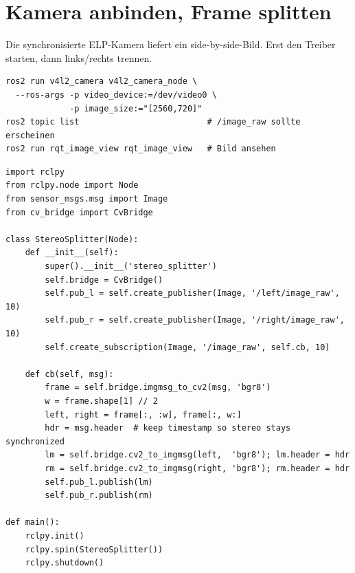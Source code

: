 
\chapter{Kamera anbinden, Frame splitten}

Die synchronisierte ELP-Kamera liefert ein side-by-side-Bild. Erst den Treiber
starten, dann links/rechts trennen.
\begin{lstlisting}[style=bash,caption={Treiber starten und Topics prüfen}]
ros2 run v4l2_camera v4l2_camera_node \
  --ros-args -p video_device:=/dev/video0 \
             -p image_size:="[2560,720]"
ros2 topic list                          # /image_raw sollte erscheinen
ros2 run rqt_image_view rqt_image_view   # Bild ansehen
\end{lstlisting}

\begin{lstlisting}[style=py,caption={Knoten: side-by-side Frame in /left und /right splitten}]
import rclpy
from rclpy.node import Node
from sensor_msgs.msg import Image
from cv_bridge import CvBridge

class StereoSplitter(Node):
    def __init__(self):
        super().__init__('stereo_splitter')
        self.bridge = CvBridge()
        self.pub_l = self.create_publisher(Image, '/left/image_raw', 10)
        self.pub_r = self.create_publisher(Image, '/right/image_raw', 10)
        self.create_subscription(Image, '/image_raw', self.cb, 10)

    def cb(self, msg):
        frame = self.bridge.imgmsg_to_cv2(msg, 'bgr8')
        w = frame.shape[1] // 2
        left, right = frame[:, :w], frame[:, w:]
        hdr = msg.header  # keep timestamp so stereo stays synchronized
        lm = self.bridge.cv2_to_imgmsg(left,  'bgr8'); lm.header = hdr
        rm = self.bridge.cv2_to_imgmsg(right, 'bgr8'); rm.header = hdr
        self.pub_l.publish(lm)
        self.pub_r.publish(rm)

def main():
    rclpy.init()
    rclpy.spin(StereoSplitter())
    rclpy.shutdown()
\end{lstlisting}
